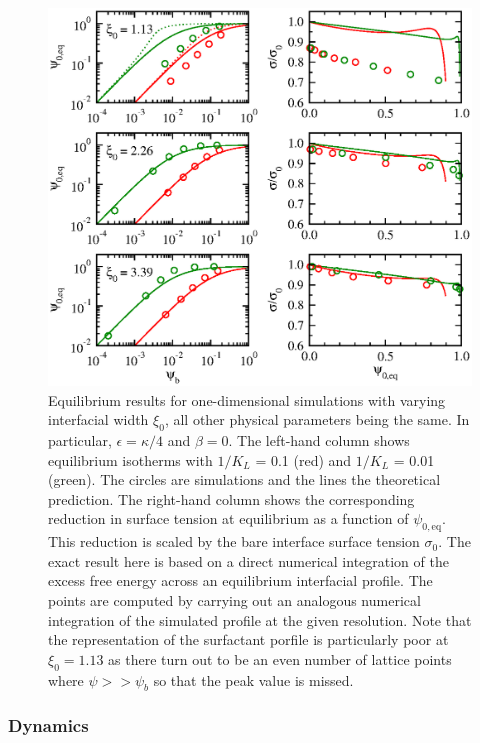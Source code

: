 \begin{figure}
\begin{center}
\includegraphics{surfactant_fig1.eps}
\end{center}
\caption{Equilibrium results for one-dimensional simulations with
varying interfacial width $\xi_0$, all other physical parameters
being the same. In particular, $\epsilon = \kappa/4$ and $\beta = 0$.
The
left-hand column shows equilibrium isotherms with $1/K_L$ = 0.1 (red)
and $1/K_L$ = 0.01 (green). The circles are simulations and the lines
the theoretical prediction. The right-hand column shows the
corresponding reduction in surface tension at equilibrium
as a function of $\psi_{0,\mathrm{eq}}$. This reduction is scaled by
the bare interface surface tension $\sigma_0$. The exact result here
is based on a direct numerical integration of the excess free energy
across an equilibrium interfacial profile. The points are computed
by carrying out an analogous numerical integration of the simulated
profile at the given resolution. Note that the representation of
the surfactant porfile is particularly poor at $\xi_0 = 1.13$ as
there turn out to be an even number of lattice points where
$\psi >> \psi_b$ so that the peak value is missed.}
\end{figure}



\subsubsection{Dynamics}

